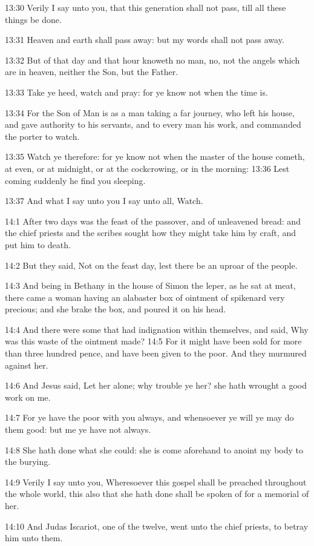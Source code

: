 13:30 Verily I say unto you, that this generation shall not pass, till
all these things be done.

13:31 Heaven and earth shall pass away: but my words shall not pass
away.

13:32 But of that day and that hour knoweth no man, no, not the angels
which are in heaven, neither the Son, but the Father.

13:33 Take ye heed, watch and pray: for ye know not when the time is.

13:34 For the Son of Man is as a man taking a far journey, who left
his house, and gave authority to his servants, and to every man his
work, and commanded the porter to watch.

13:35 Watch ye therefore: for ye know not when the master of the house
cometh, at even, or at midnight, or at the cockcrowing, or in the
morning: 13:36 Lest coming suddenly he find you sleeping.

13:37 And what I say unto you I say unto all, Watch.

14:1 After two days was the feast of the passover, and of unleavened
bread: and the chief priests and the scribes sought how they might
take him by craft, and put him to death.

14:2 But they said, Not on the feast day, lest there be an uproar of
the people.

14:3 And being in Bethany in the house of Simon the leper, as he sat
at meat, there came a woman having an alabaster box of ointment of
spikenard very precious; and she brake the box, and poured it on his
head.

14:4 And there were some that had indignation within themselves, and
said, Why was this waste of the ointment made?  14:5 For it might have
been sold for more than three hundred pence, and have been given to
the poor. And they murmured against her.

14:6 And Jesus said, Let her alone; why trouble ye her? she hath
wrought a good work on me.

14:7 For ye have the poor with you always, and whensoever ye will ye
may do them good: but me ye have not always.

14:8 She hath done what she could: she is come aforehand to anoint my
body to the burying.

14:9 Verily I say unto you, Wheresoever this gospel shall be preached
throughout the whole world, this also that she hath done shall be
spoken of for a memorial of her.

14:10 And Judas Iscariot, one of the twelve, went unto the chief
priests, to betray him unto them.

